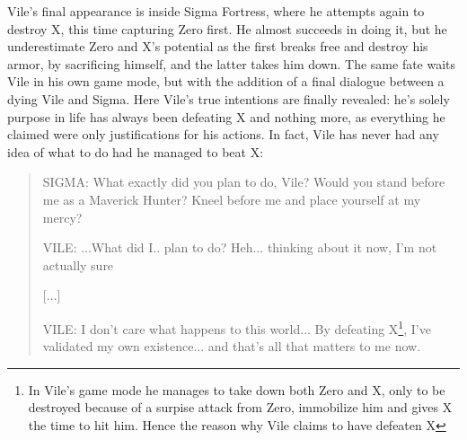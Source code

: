 Vile's final appearance is inside Sigma Fortress, where he attempts again to destroy X, this time capturing Zero first. He almost succeeds in doing it, but he underestimate Zero and X's potential as the first breaks free and destroy his armor, by sacrificing himself, and the latter takes him down. The same fate waits Vile in his own game mode, but with the addition of a final dialogue between a dying Vile and Sigma. Here Vile's true intentions are finally revealed: he's solely purpose in life has always been defeating X and nothing more, as everything he claimed were only justifications for his actions. In fact, Vile has never had any idea of what to do had he managed to beat X:
\begin{quote}
	SIGMA: What exactly did you plan to do, Vile? Would you stand before me as a Maverick Hunter? Kneel before me and place yourself at my mercy?
	
	VILE: ...What did I.. plan to do? Heh... thinking about it now, I'm not actually sure

	[$\dots$]

	VILE: I don't care what happens to this world... By defeating X\footnote{In Vile's game mode he manages to take down both Zero and X, only to be destroyed because of a surpise attack from Zero, immobilize him and gives X the time to hit him. Hence the reason why Vile claims to have defeaten X}, I've validated
	my own existence... and that's all that matters to me now.
\end{quote}
